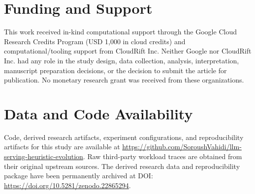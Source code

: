 \documentclass[preprint,12pt]{elsarticle}
\begin{document}
\section*{Funding and Support}
This work received in-kind computational support through the Google Cloud Research Credits Program (USD 1,000 in cloud credits) and computational/tooling support from CloudRift Inc. Neither Google nor CloudRift Inc. had any role in the study design, data collection, analysis, interpretation, manuscript preparation decisions, or the decision to submit the article for publication. No monetary research grant was received from these organizations.

\section*{Data and Code Availability}
Code, derived research artifacts, experiment configurations, and reproducibility artifacts for this study are available at \url{https://github.com/SoroushVahidi/llm-serving-heuristic-evolution}. Raw third-party workload traces are obtained from their original upstream sources. The derived research data and reproducibility package have been permanently archived at DOI: \url{https://doi.org/10.5281/zenodo.22865294}.




\end{document}
